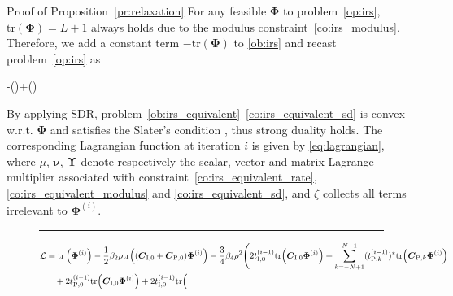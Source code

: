 \documentclass[journal]{IEEEtran}
\begin{document}
	\begin{appendix}
		\begin{subsection}{Proof of Proposition~\ref{pr:relaxation}}\label{ap:relaxation}
			For any feasible $\boldsymbol{\Phi}$ to problem~\eqref{op:irs}, $\mathrm{tr}(\boldsymbol{\Phi})=L+1$ always holds due to the modulus constraint~\eqref{co:irs_modulus}. Therefore, we add a constant term $-\mathrm{tr}(\boldsymbol{\Phi})$ to \eqref{ob:irs} and recast problem~\eqref{op:irs} as
			\begin{maxi!}
				{\boldsymbol{\Phi}}{-(\boldsymbol{\Phi})+(\boldsymbol{\Phi})}{\label{op:irs_equivalent}}{\label{ob:irs_equivalent}}
				\label{co:irs_equivalent_rate}
				\label{co:irs_equivalent_modulus}
				\label{co:irs_equivalent_sd}
			\end{maxi!}
			By applying SDR, problem~\eqref{ob:irs_equivalent}--\eqref{co:irs_equivalent_sd} is convex w.r.t. $\boldsymbol{\Phi}$ and satisfies the Slater's condition \cite{Boyd2004}, thus strong duality holds. The corresponding Lagrangian function at iteration $i$ is given by \eqref{eq:lagrangian}, where $\mu$, $\boldsymbol{\nu}$, $\boldsymbol{\Upsilon}$ denote respectively the scalar, vector and matrix Lagrange multiplier associated with constraint~\eqref{co:irs_equivalent_rate}, \eqref{co:irs_equivalent_modulus} and \eqref{co:irs_equivalent_sd}, and $\zeta$ collects all terms irrelevant to $\boldsymbol{\Phi}^{(i)}$.
			\begin{figure*}[!b]
				\hrule
				\begin{align}\label{eq:lagrangian}
					\mathcal{L}
					& = \mathrm{tr}\left(\boldsymbol{\Phi}^{(i)}\right) - \frac{1}{2} \beta_2 \rho \mathrm{tr}\Bigl(
							(\boldsymbol{C}_{\mathrm{I},0} + \boldsymbol{C}_{\mathrm{P},0}) \boldsymbol{\Phi}^{(i)}
						\Bigr) - \frac{3}{4} \beta_4 \rho^2 \Biggl(
							2 t_{\mathrm{I},0}^{(i-1)} \mathrm{tr}\Bigl(
								\boldsymbol{C}_{\mathrm{I},0} \boldsymbol{\Phi}^{(i)}
							\Bigr) + \sum_{k=-N+1}^{N-1} (t_{\mathrm{P},k}^{(i-1)})^* \mathrm{tr}\Bigl(
								\boldsymbol{C}_{\mathrm{P},k} \boldsymbol{\Phi}^{(i)}
							\Bigr)\nonumber\\
					& \quad + 2 t_{\mathrm{P},0}^{(i-1)} \mathrm{tr}\Bigl(
							\boldsymbol{C}_{\mathrm{I},0} \boldsymbol{\Phi}^{(i)}
						\Bigr) + 2 t_{\mathrm{I},0}^{(i-1)} \mathrm{tr}\Bigl(

\end{align}
\end{figure*}
\end{subsection}
\end{appendix}
\end{document}
